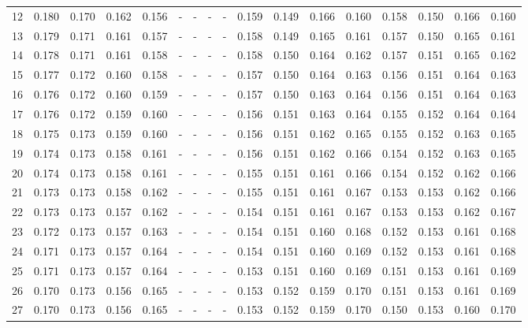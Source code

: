 \documentclass{report}
\begin{document}
\begin{appendices}
\begin{table}
\begin{tabular}{|c|cccc|cccc|cccc|cccc|}
12 & 0.180 & 0.170 & 0.162 & 0.156 &   -   &   -   &   -   &   -   & 0.159 & 0.149 & 0.166 & 0.160 & 0.158 & 0.150 & 0.166 & 0.160\\
13 & 0.179 & 0.171 & 0.161 & 0.157 &   -   &   -   &   -   &   -   & 0.158 & 0.149 & 0.165 & 0.161 & 0.157 & 0.150 & 0.165 & 0.161\\
14 & 0.178 & 0.171 & 0.161 & 0.158 &   -   &   -   &   -   &   -   & 0.158 & 0.150 & 0.164 & 0.162 & 0.157 & 0.151 & 0.165 & 0.162\\
15 & 0.177 & 0.172 & 0.160 & 0.158 &   -   &   -   &   -   &   -   & 0.157 & 0.150 & 0.164 & 0.163 & 0.156 & 0.151 & 0.164 & 0.163\\
16 & 0.176 & 0.172 & 0.160 & 0.159 &   -   &   -   &   -   &   -   & 0.157 & 0.150 & 0.163 & 0.164 & 0.156 & 0.151 & 0.164 & 0.163\\
17 & 0.176 & 0.172 & 0.159 & 0.160 &   -   &   -   &   -   &   -   & 0.156 & 0.151 & 0.163 & 0.164 & 0.155 & 0.152 & 0.164 & 0.164\\
18 & 0.175 & 0.173 & 0.159 & 0.160 &   -   &   -   &   -   &   -   & 0.156 & 0.151 & 0.162 & 0.165 & 0.155 & 0.152 & 0.163 & 0.165\\
19 & 0.174 & 0.173 & 0.158 & 0.161 &   -   &   -   &   -   &   -   & 0.156 & 0.151 & 0.162 & 0.166 & 0.154 & 0.152 & 0.163 & 0.165\\
20 & 0.174 & 0.173 & 0.158 & 0.161 &   -   &   -   &   -   &   -   & 0.155 & 0.151 & 0.161 & 0.166 & 0.154 & 0.152 & 0.162 & 0.166\\
21 & 0.173 & 0.173 & 0.158 & 0.162 &   -   &   -   &   -   &   -   & 0.155 & 0.151 & 0.161 & 0.167 & 0.153 & 0.153 & 0.162 & 0.166\\
22 & 0.173 & 0.173 & 0.157 & 0.162 &   -   &   -   &   -   &   -   & 0.154 & 0.151 & 0.161 & 0.167 & 0.153 & 0.153 & 0.162 & 0.167\\
23 & 0.172 & 0.173 & 0.157 & 0.163 &   -   &   -   &   -   &   -   & 0.154 & 0.151 & 0.160 & 0.168 & 0.152 & 0.153 & 0.161 & 0.168\\
24 & 0.171 & 0.173 & 0.157 & 0.164 &   -   &   -   &   -   &   -   & 0.154 & 0.151 & 0.160 & 0.169 & 0.152 & 0.153 & 0.161 & 0.168\\
25 & 0.171 & 0.173 & 0.157 & 0.164 &   -   &   -   &   -   &   -   & 0.153 & 0.151 & 0.160 & 0.169 & 0.151 & 0.153 & 0.161 & 0.169\\
26 & 0.170 & 0.173 & 0.156 & 0.165 &   -   &   -   &   -   &   -   & 0.153 & 0.152 & 0.159 & 0.170 & 0.151 & 0.153 & 0.161 & 0.169\\
27 & 0.170 & 0.173 & 0.156 & 0.165 &   -   &   -   &   -   &   -   & 0.153 & 0.152 & 0.159 & 0.170 & 0.150 & 0.153 & 0.160 & 0.170\\

\end{tabular}
\end{table}
\end{appendices}
\end{document}
